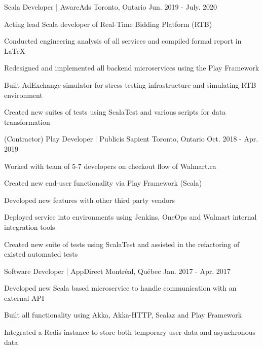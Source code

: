 \begin{cventries}
    {Scala Developer | AwareAds}
    {Toronto, Ontario}
    {Jun. 2019 - July. 2020}
    {
      \begin{cvitems}
        \item {Acting lead Scala developer of Real-Time Bidding Platform (RTB)}
        \item {Conducted engineering analysis of all services and compiled formal report in \LaTeX}
        \item {Redesigned and implemented all backend microservices using the Play Framework}
        \item {Built AdExchange simulator for stress testing infrastructure and simulating RTB environment}
        \item {Created new suites of tests using ScalaTest and various scripts for data transformation}
      \end{cvitems}
    }
    {(Contractor) Play Developer | Publicis Sapient}
    {Toronto, Ontario}
    {Oct. 2018 - Apr. 2019}
    {
      \begin{cvitems}
        \item {Worked with team of 5-7 developers on checkout flow of Walmart.ca}
        \item {Created new end-user functionality via Play Framework (Scala) }
        \item {Developed new features with other third party vendors}
        \item {Deployed service into environments using Jenkins, OneOps and Walmart internal integration tools}
        \item {Created new suite of tests using ScalaTest and assisted in the refactoring of existed automated tests}
      \end{cvitems}
    }
    {\vspace{-3mm}Software Developer | AppDirect}
    {Montréal, Québec}
    {Jan. 2017 - Apr. 2017 }
    {
      \begin{cvitems}
        \item {Developed new Scala based microservice to handle communication with an external API}
        \item {Built all functionality using Akka, Akka-HTTP, Scalaz and Play Framework}
        \item {Integrated a Redis instance to store both temporary user data and asynchronous data}

\end{cvitems}}
\end{cventries}
